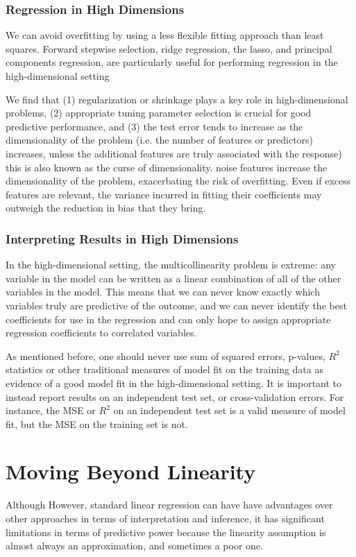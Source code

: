 \documentclass{article}
\numberwithin{equation}{section}
\begin{document}
\begin{enumerate}
\subsubsection{Regression in High Dimensions}

We can avoid overfitting by using a less flexible fitting approach
than least squares. Forward stepwise selection, ridge
regression, the lasso, and principal components regression, are particularly useful for performing regression in the high-dimensional setting

We find that (1) regularization or shrinkage plays a key role in high-dimensional problems, (2) appropriate tuning parameter selection is crucial for good predictive performance, and (3) the test error tends to increase as the dimensionality of the problem
(i.e. the number of features or predictors) increases, unless the additional features are truly associated with the response) this is also known as the curse of dimensionality. noise features increase the dimensionality of the problem, exacerbating the risk of overfitting.  Even if excess features are relevant, the variance incurred in fitting their coefficients may outweigh the reduction in bias that they bring.


\subsubsection{Interpreting Results in High Dimensions}
In the high-dimensional setting, the multicollinearity problem is extreme: any variable in the model can be written as a linear combination of all of the other variables in the model. This
means that we can never know exactly which variables truly are predictive of the outcome, and we can never identify the best coefficients for use in the regression and can only hope to assign appropriate regression coefficients to correlated variables.

As mentioned before, one should never use sum of squared errors, p-values, $R^2$ statistics  or other traditional measures of model fit on the training data as evidence of a good model fit in the high-dimensional setting. It is important to instead report results on an independent test set, or cross-validation errors. For instance, the MSE or $R^2$ on an independent test set is a valid measure of model fit, but the MSE on the training set is not.



\newpage
\section{Moving Beyond Linearity}
Although However, standard linear regression can have  have advantages over other approaches in terms of interpretation and inference, it has significant limitations in terms of predictive power because the linearity assumption is almost always an approximation, and sometimes a poor one. 


\end{enumerate}
\end{document}
